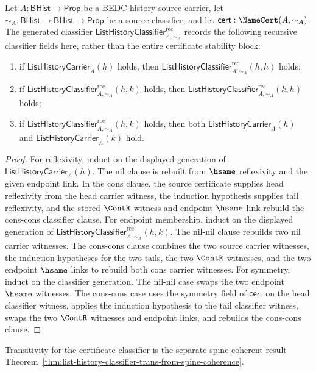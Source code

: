 \begin{theorem}\label{thm:list-recursive-history-classifier-equivalence-fields}
Let $A : \mathsf{BHist}\to\mathsf{Prop}$ be a BEDC history source carrier, let $\sim_A : \mathsf{BHist}\to\mathsf{BHist}\to\mathsf{Prop}$ be a source classifier, and let $\mathsf{cert} : \NameCert(A,\sim_A)$. The generated classifier $\mathsf{ListHistoryClassifier}^{\mathrm{rec}}_{A,\sim_A}$ records the following recursive classifier fields here, rather than the entire certificate stability block:
\begin{enumerate}
  \item if $\mathsf{ListHistoryCarrier}_A(h)$ holds, then $\mathsf{ListHistoryClassifier}^{\mathrm{rec}}_{A,\sim_A}(h,h)$ holds;
  \item if $\mathsf{ListHistoryClassifier}^{\mathrm{rec}}_{A,\sim_A}(h,k)$ holds, then $\mathsf{ListHistoryClassifier}^{\mathrm{rec}}_{A,\sim_A}(k,h)$ holds;
  \item if $\mathsf{ListHistoryClassifier}^{\mathrm{rec}}_{A,\sim_A}(h,k)$ holds, then both $\mathsf{ListHistoryCarrier}_A(h)$ and $\mathsf{ListHistoryCarrier}_A(k)$ hold.
\end{enumerate}
\end{theorem}
\begin{proof}
For reflexivity, induct on the displayed generation of $\mathsf{ListHistoryCarrier}_A(h)$. The nil clause is rebuilt from $\hsame$ reflexivity and the given endpoint link. In the cons clause, the source certificate supplies head reflexivity from the head carrier witness, the induction hypothesis supplies tail reflexivity, and the stored $\ContR$ witness and endpoint $\hsame$ link rebuild the cons-cons classifier clause.
For endpoint membership, induct on the displayed generation of $\mathsf{ListHistoryClassifier}^{\mathrm{rec}}_{A,\sim_A}(h,k)$. The nil-nil clause rebuilds two nil carrier witnesses. The cons-cons clause combines the two source carrier witnesses, the induction hypotheses for the two tails, the two $\ContR$ witnesses, and the two endpoint $\hsame$ links to rebuild both cons carrier witnesses.
For symmetry, induct on the classifier generation. The nil-nil case swaps the two endpoint $\hsame$ witnesses. The cons-cons case uses the symmetry field of $\mathsf{cert}$ on the head classifier witness, applies the induction hypothesis to the tail classifier witness, swaps the two $\ContR$ witnesses and endpoint links, and rebuilds the cons-cons clause.
\end{proof}
Transitivity for the certificate classifier is the separate spine-coherent result Theorem~\ref{thm:list-history-classifier-trans-from-spine-coherence}.

